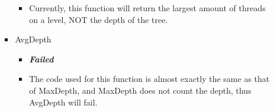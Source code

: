 \begin{itemize}
\begin{itemize}
\begin{itemize}
\begin{itemize}
					\item Currently, this function will return the largest amount of threads on a level, NOT the depth of the tree.
				\end{itemize}
				\item AvgDepth
				\begin{itemize}
					\item \color{red}
\textbf{\small \emph{Failed}} \\\color{black}
					\item The code used for this function is almost exactly the same as that of MaxDepth, and MaxDepth does not count the depth, thus AvgDepth will fail.
				\end{itemize}
			\end{itemize}
		\end{itemize}
\end{itemize}


